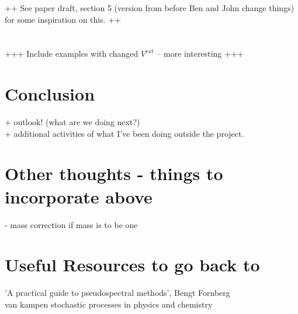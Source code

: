 \documentclass[11pt, a4paper]{article}
\theoremstyle{definition}
\begin{document}
++ See paper draft, section 5 (version from before Ben and John change things) for some inspiration on this. ++ \\
\\
\\
+++ Include examples with changed $V^{ext}$ -- more interesting +++


\section{Conclusion}
+ outlook! (what are we doing next?)\\
+ additional activities of what I've been doing outside the project.


\pagebreak	



\pagebreak
\appendix

\section{Other thoughts - things to incorporate above}
- mass correction if mass is to be one\\


\section{Useful Resources to go back to}
'A practical guide to pseudospectral methods', Bengt Fornberg\\
van kampen stochastic processes in physics and chemistry
\end{document}
